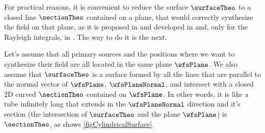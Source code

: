 For practical reasons, it is convenient to reduce the surface $\surfaceTheo$ to a closed line $\sectionTheo$ contained on a plane, that would correctly synthesize the field on that plane, as it is proposed in \cite{Vogel} and developed in \cite{Start1997} and, only for the Rayleigh integrals, in \cite{Verheijen}. The way to do it is the next.

Let's assume that all primary sources and the positions where we want to synthesize their field are all located in the same plane $\wfsPlane$. We also assume that $\surfaceTheo$ is a surface formed by all the lines that are parallel to the normal vector of $\wfsPlane$, $\wfsPlaneNormal$, and intersect with a closed 2D curved $\sectionTheo$ contained on $\wfsPlane$. In other words, it is like a tube infinitely long that extends in the $\wfsPlaneNormal$ direction and it's section (the intersection of $\surfaceTheo$ and the plane $\wfsPlane$) is $\sectionTheo$, as shows \autoref{figCylindricalSurface}.

